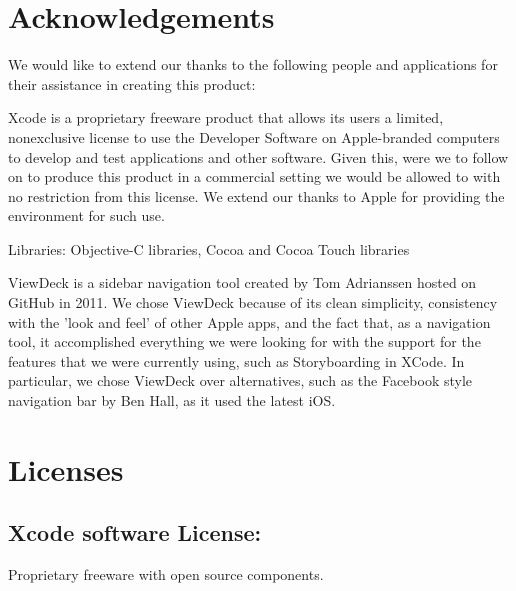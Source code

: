 \documentclass[a4wide, 10pt]{article}
\begin{document}
\section{Acknowledgements}

We would like to extend our thanks to the following people and applications for their assistance in creating this product:

Xcode is a proprietary freeware product that allows its users a limited, nonexclusive license to use the Developer Software on Apple-branded computers to develop and test applications and other software. Given this, were we to follow on to produce this product in a commercial setting we would be allowed to with no restriction from this license. We extend our thanks to Apple for providing the environment for such use.




Libraries: Objective-C libraries, Cocoa and Cocoa Touch libraries



ViewDeck is a sidebar navigation tool created by Tom Adrianssen hosted on GitHub in 2011. We chose ViewDeck because of its clean simplicity, consistency with the 'look and feel' of other Apple apps, and the fact that, as a navigation tool, it accomplished everything we were looking for with the support for the features that we were currently using, such as Storyboarding in XCode. In particular, we chose ViewDeck over alternatives, such as the Facebook style navigation bar by Ben Hall, as it used the latest iOS.


\section{Licenses}

\subsection{Xcode software License:}

Proprietary freeware with open source components.
\end{document}
